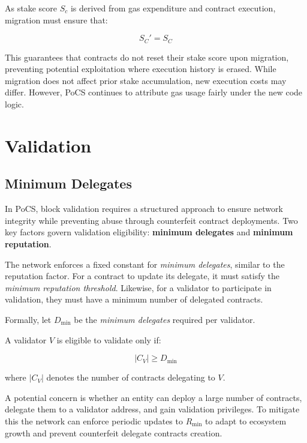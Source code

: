 \documentclass{article}
\begin{document}
As stake score \( S_c \) is derived from gas expenditure and contract execution, migration must ensure that:  

\begin{equation}
S_{C}' = S_{C}
\end{equation}

This guarantees that contracts do not reset their stake score upon migration, preventing potential exploitation where execution history is erased. While migration does not affect prior stake accumulation, new execution costs may differ. However, PoCS continues to attribute gas usage fairly under the new code logic.  

\section{Validation}

\subsection{Minimum Delegates}

In PoCS, block validation requires a structured approach to ensure network integrity while preventing abuse through counterfeit contract deployments. Two key factors govern validation eligibility: \textbf{minimum delegates} and \textbf{minimum reputation}.  

The network enforces a fixed constant for \textit{minimum delegates}, similar to the reputation factor. For a contract to update its delegate, it must satisfy the \textit{minimum reputation threshold}. Likewise, for a validator to participate in validation, they must have a minimum number of delegated contracts.  

Formally, let \( D_{\text{min}} \) be the \textit{minimum delegates} required per validator.  

A validator \( V \) is eligible to validate only if:  

\begin{equation}
    |C_V| \geq D_{\text{min}}
\end{equation}

where \( |C_V| \) denotes the number of contracts delegating to \( V \).  

A potential concern is whether an entity can deploy a large number of contracts, delegate them to a validator address, and gain validation privileges. To mitigate this the network can enforce periodic updates to \( R_{\text{min}} \) to adapt to ecosystem growth and prevent counterfeit delegate contracts creation. 
\end{document}
